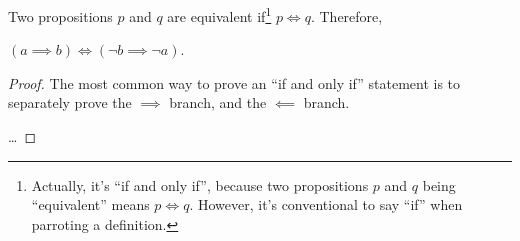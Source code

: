 Two propositions $p$ and $q$ are equivalent if\footnote{Actually, it's
  ``if and only if'', because two propositions $p$ and $q$ being
  ``equivalent'' means $p \iff q$. However, it's conventional to say
  ``if'' when parroting a definition.} $p \iff q$. Therefore,

\begin{lemma}
  \label{thm:contrapositive}
  $(a \implies b) \iff (\lnot b \implies \lnot a)$.
\end{lemma}

\begin{proof}
  The most common way to prove an ``if and only if'' statement is to
  separately prove the $\implies$ branch, and the $\impliedby$ branch.

  \dots
\end{proof}

